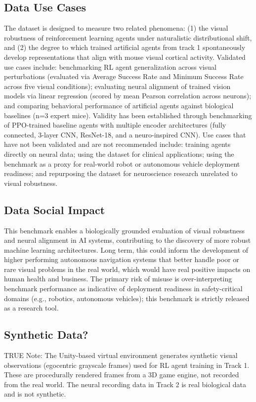\subsection{Data Use Cases}
The dataset is designed to measure two related phenomena: (1) the visual robustness of reinforcement learning agents under naturalistic distributional shift, and (2) the degree to which trained artificial agents from track 1 spontaneously develop representations that align with mouse visual cortical activity. Validated use cases include: benchmarking RL agent generalization across visual perturbations (evaluated via Average Success Rate and Minimum Success Rate across five visual conditions); evaluating neural alignment of trained vision models via linear regression (scored by mean Pearson correlation across neurons); and comparing behavioral performance of artificial agents against biological baselines (n=3 expert mice). Validity has been established through benchmarking of PPO-trained baseline agents with multiple encoder architectures (fully connected, 3-layer CNN, ResNet-18, and a neuro-inspired CNN). Use cases that have not been validated and are not recommended include: training agents directly on neural data; using the dataset for clinical applications; using the benchmark as a proxy for real-world robot or autonomous vehicle deployment readiness; and repurposing the dataset for neuroscience research unrelated to visual robustness.


\subsection{Data Social Impact}
This benchmark enables a biologically grounded evaluation of visual robustness and neural alignment in AI systems, contributing to the discovery of more robust machine learning architectures. Long term, this could inform the development of higher performing autonomous navigation systems that better handle poor or rare visual problems in the real world, which would have real positive impacts on human health and business. The primary risk of misuse is over-interpreting benchmark performance as indicative of deployment readiness in safety-critical domains (e.g., robotics, autonomous vehicles); this benchmark is strictly released as a research tool.


\subsection{Synthetic Data?}
TRUE
Note: The Unity-based virtual environment generates synthetic visual observations (egocentric grayscale frames) used for RL agent training in Track 1. These are procedurally rendered frames from a 3D game engine, not recorded from the real world. The neural recording data in Track 2 is real biological data and is not synthetic.

